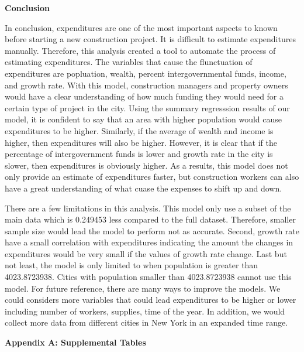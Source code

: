 \documentclass[11pt]{article}\usepackage[]{graphicx}\usepackage[]{color}
\begin{document}
\noindent\textbf{Conclusion}

\noindent In conclusion, expenditures are one of the most important aspects to known before starting a new construction project. It is difficult to estimate expenditures manually. Therefore, this analysis created a tool to automate the process of estimating expenditures. The variables that cause the flunctuation of expenditures are popluation, wealth, percent intergovernmental funds, income, and growth rate. With this model, construction managers and property owners would have a clear understanding of how much funding they would need for a certain type of project in the city. Using the summary regresssion results of our model, it is confident to say that an area with higher population would cause expenditures to be higher. Similarly, if the average of wealth and income is higher, then expenditures will also be higher. However, it is clear that if the percentage of intergovernment funds is lower and growth rate in the city is slower, then expenditures is obviously higher. As a results, this model does not only provide an estimate of expenditures faster, but construction workers can also have a great understanding of what cuase the expenses to shift up and down.

\noindent There are a few limitations in this analysis. This model only use a subset of the main data which is 0.249453 less compared to the full dataset. Therefore, smaller sample size would lead the model to perform not as accurate. Second, growth rate have a small correlation with expenditures indicating the amount the changes in expenditures would be very small if the values of growth rate change. Last but not least, the model is only limited to when population is greater than 4023.8723938. Cities with population smaller than 4023.8723938 cannot use this model. For future reference, there are many ways to improve the models. We could considers more variables that could lead expenditures to be higher or lower including number of workers, supplies, time of the year. In addition, we would collect more data from different cities in New York in an expanded time range.    
\hfill \break

\clearpage
\newpage
\noindent \Large{{\bf Appendix A: Supplemental Tables}}
\end{document}
